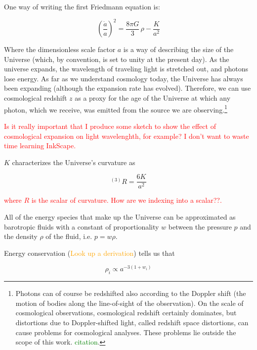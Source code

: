 One way of writing the first Friedmann equation is:


\begin{equation}
\label{eq: Friedmann1}
\left( \frac{\dot{a}}{a} \right)^2 = \frac{8 \pi G}{3} \, \rho - \frac{K}{a^2}
\end{equation}

Where the dimensionless scale factor $a$ is a way of describing the size of
the Universe (which, by convention, is set to unity at the present day). As 
the universe expands, the wavelength of traveling light is stretched out, and
photons lose energy. As far as we understand cosmology today, the Universe has
always been expanding (although the expansion rate has evolved). Therefore, we
can use cosmological redshift $z$ as a proxy for the age of the Universe at 
which any photon, which we receive, was emitted from the source we are 
observing.\footnote{Photons can of course be redshifted also according to the
Doppler shift (the motion of bodies along the line-of-sight of the 
observation). On the scale of cosmological observations, cosmological redshift
certainly dominates, but distortions due to Doppler-shifted light,
called redshift space distortions, can cause problems for cosmological 
analyses. These problems lie outside the scope of this work.
\textcolor{green}{citation}.}

\textcolor{red}{Is it really important that I produce some sketch to show the
effect of cosmological expansion on light wavelenghth, for example? I don't
want to waste time learning InkScape.}

$K$ characterizes the Universe's curvature as

\begin{equation}
^{(3)}R = \frac{6K}{a^2}
\end{equation}

\textcolor{red}{where $R$ is the scalar of curvature. How are we indexing
into a scalar??.}

All of the energy species that make up the Universe can be approximated as
barotropic fluids with a constant of proportionality $w$ between the
pressure $p$ and the density $\rho$ of the fluid, i.e. $p = w \rho$.

Energy conservation (\textcolor{orange}{Look up a derivation}) tells us that

\begin{equation}
\rho_i \propto a^{-3 (1 + w_i)}
\end{equation}

